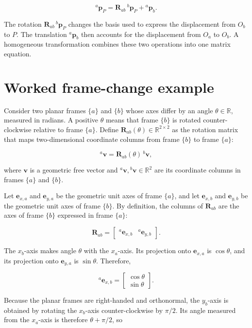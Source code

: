 \documentclass[
  australian,
  12pt,
  letterpaper,
  DIV=11,
  numbers=noendperiod,
  twoside]{scrreprt}
\begin{document}
\[
{}^{a}\mathbf{p}_P
=
\mathbf{R}_{ab}\,{}^{b}\mathbf{p}_P
+{}^{a}\mathbf{p}_b.
\]

The rotation \(\mathbf R_{ab}\,{}^{b}\mathbf p_P\) changes the basis
used to express the displacement from \(O_b\) to \(P\). The translation
\({}^{a}\mathbf p_b\) then accounts for the displacement from \(O_a\) to
\(O_b\). A homogeneous transformation combines these two operations into
one matrix equation.

\section{Worked frame-change example}\label{worked-frame-change-example}

Consider two planar frames \(\{a\}\) and \(\{b\}\) whose axes differ by
an angle \(\theta\in\mathbb R\), measured in radians. A positive
\(\theta\) means that frame \(\{b\}\) is rotated counter-clockwise
relative to frame \(\{a\}\). Define
\(\mathbf R_{ab}(\theta)\in\mathbb R^{2\times2}\) as the rotation matrix
that maps two-dimensional coordinate columns from frame \(\{b\}\) to
frame \(\{a\}\):

\[
{}^{a}\mathbf v
=
\mathbf R_{ab}(\theta)\,{}^{b}\mathbf v,
\]

where \(\mathbf v\) is a geometric free vector and
\({}^{a}\mathbf v,{}^{b}\mathbf v\in\mathbb R^2\) are its coordinate
columns in frames \(\{a\}\) and \(\{b\}\).

Let \(\mathbf e_{x,a}\) and \(\mathbf e_{y,a}\) be the geometric unit
axes of frame \(\{a\}\), and let \(\mathbf e_{x,b}\) and
\(\mathbf e_{y,b}\) be the geometric unit axes of frame \(\{b\}\). By
definition, the columns of \(\mathbf R_{ab}\) are the axes of frame
\(\{b\}\) expressed in frame \(\{a\}\):

\[
\mathbf R_{ab}
=
\begin{bmatrix}
{}^{a}\mathbf e_{x,b}&{}^{a}\mathbf e_{y,b}
\end{bmatrix}.
\]

The \(x_b\)-axis makes angle \(\theta\) with the \(x_a\)-axis. Its
projection onto \(\mathbf e_{x,a}\) is \(\cos\theta\), and its
projection onto \(\mathbf e_{y,a}\) is \(\sin\theta\). Therefore,

\[
{}^{a}\mathbf e_{x,b}
=
\begin{bmatrix}
\cos\theta\\
\sin\theta
\end{bmatrix}.
\]

Because the planar frames are right-handed and orthonormal, the
\(y_b\)-axis is obtained by rotating the \(x_b\)-axis counter-clockwise
by \(\pi/2\). Its angle measured from the \(x_a\)-axis is therefore
\(\theta+\pi/2\), so
\end{document}

